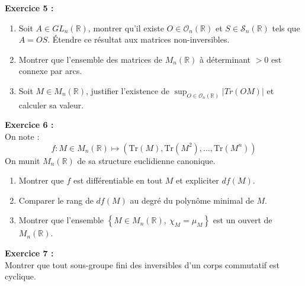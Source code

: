 \documentclass[11pt,a4paper]{article}
\begin{document}
\textbf{Exercice 5 :}
\begin{enumerate}
\item Soit $A\in GL_n(\mathbb{R})$, montrer qu'il existe $O\in \mathcal{O}_n(\mathbb{R})$ et $S \in \mathcal{S}_n(\mathbb{R})$ tels que $A=OS$. Étendre ce résultat aux matrices non-inversibles.
\item Montrer que l'ensemble des matrices de $M_n(\mathbb{R})$ à déterminant $> 0$ est connexe par arcs.
\item Soit $M\in M_n(\mathbb{R})$, justifier l'existence de $\displaystyle \sup_{O\in \mathcal{O}_n(\mathbb{R})} \left | Tr(OM) \right |$ et calculer sa valeur. \\
\end{enumerate}

\textbf{Exercice 6 :} \\
On note : \[f : M\in M_n(\mathbb{R}) \mapsto (\text{Tr}(M),\text{Tr}(M^2),\dots,\text{Tr}(M^n))\]
On munit $ M_n(\mathbb{R})$ de sa structure euclidienne canonique.
\begin{enumerate}
\item Montrer que $f$ est différentiable en tout $M$ et expliciter $df(M)$.
\item Comparer le rang de $df(M)$ au degré du polynôme minimal de $M$.
\item Montrer que l'ensemble $\left \{ M \in M_n(\mathbb{R}), \ \chi_M = \mu_M \right \} $ est un ouvert de $M_n(\mathbb{R})$. \\
\end{enumerate}

\textbf{Exercice 7 :} \\
Montrer que tout sous-groupe fini des inversibles d'un corps commutatif est cyclique.
\end{document}

